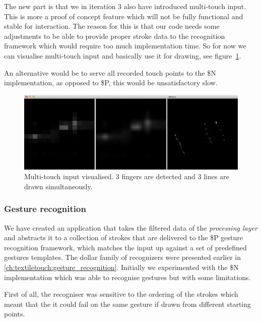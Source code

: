 The new part is that we in iteration 3 also have introduced multi-touch input.
This is more a proof of concept feature which will not be fully functional and stable for interaction. The reason for this is that our code needs some adjustments to be able to provide proper stroke data to the recognition framework which would require too much implementation time.
So for now we can visualise multi-touch input and basically use it for drawing, see figure~\ref{fig:textiletouch:multitouch}.

An alternative would be to serve all recorded touch points to the \$N implementation, as opposed to \$P,  this would be unsatisfactory slow.

\begin{figure}[h]
  \centering
      \includegraphics[width=.9\textwidth]{figures/touch/tt_multitouch}
  \caption[The data flow from sensor to application.]
   {Multi-touch input visualised. 3 fingers are detected and 3 lines are drawn simultaneously.}
   \label{fig:textiletouch:multitouch}
\end{figure}

\subsubsection{Gesture recognition} 
\label{ch:textiletouch:gesture_implementation}

We have created an application that takes the filtered data of the \emph{processing layer} and abstracts it to a collection of strokes that are delivered to the \$P gesture recognition framework, which matches the input up against a set of predefined gestures templates.
The dollar family of recognizers were presented earlier in \ref{ch:textiletouch:gesture_recognition}.
Initially we experimented with the \$N implementation which was able to recognise gestures but with some limitations.

First of all, the recogniser was sensitive to the ordering of the strokes which meant that the it could fail on the same gesture if drawn from different starting points. 

